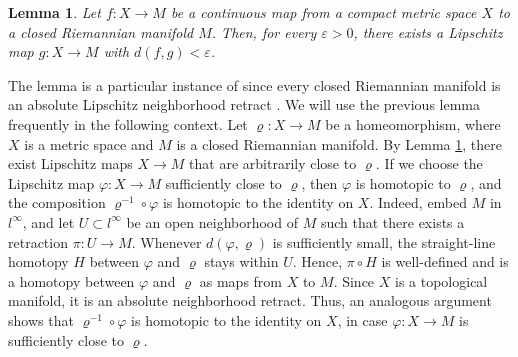 \documentclass{amsart}
\newtheorem{lemma}[theorem]{Lemma}
\numberwithin{equation}{section}
\begin{document}
        \begin{lemma}\label{lemma: lip-approx-easy}
            Let \(f\colon X \to M\) be a continuous map from a compact metric space \(X\) to a closed Riemannian manifold $M$. Then, for every \(\varepsilon>0\), there exists a Lipschitz map \(g \colon X \to M\) with \(d(f, g)<\varepsilon\). 
        \end{lemma}

        The lemma is a particular instance of \cite[Lemma 2.1]{basso2023geometric} since every closed Riemannian manifold is an absolute Lipschitz neighborhood retract \cite[Theorem~3.1]{hohti-1993}. We will use the previous lemma frequently in the following context. Let $\varrho\colon X \to M$ be a homeomorphism, where $X$ is a metric space and $M$ is a closed Riemannian manifold. By Lemma \ref{lemma: lip-approx-easy}, there exist Lipschitz maps $X \to M$ that are arbitrarily close to $\varrho$. If we choose the Lipschitz map $\varphi\colon X \to M$ sufficiently close to $\varrho$, then $\varphi$ is homotopic to $\varrho$, and the composition $\varrho^{-1}\circ \varphi$ is homotopic to the identity on $X$. Indeed, embed $M$ in $l^\infty$, and let $U \subset l^\infty$ be an open neighborhood of $M$ such that there exists a retraction $\pi \colon U \to M$. Whenever $d(\varphi,\varrho)$ is sufficiently small, the straight-line homotopy $H$ between $\varphi$ and $\varrho$ stays within $U$. Hence, $\pi \circ H$ is well-defined and is a homotopy between $\varphi$ and $\varrho$ as maps from $X$ to $M$. Since $X$ is a topological manifold, it is an absolute neighborhood retract. Thus, an analogous argument shows that $\varrho^{-1}\circ \varphi$ is homotopic to the identity on $X$, in case $\varphi\colon X \to M$ is sufficiently close to $\varrho$.

\end{document}

